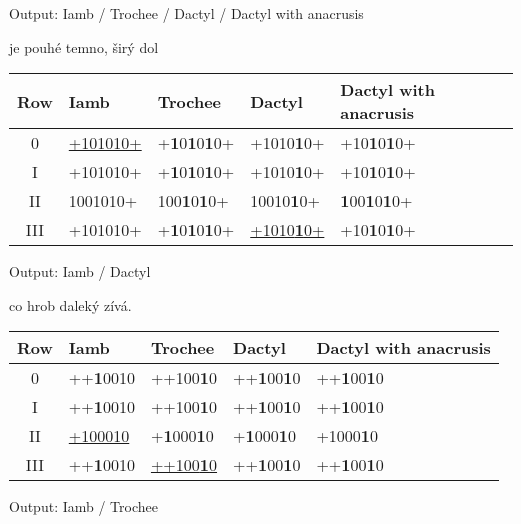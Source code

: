 Output: Iamb / Trochee / Dactyl / Dactyl with anacrusis

\begin{center}
je pouhé temno, širý dol\\
\begin{tabular}{c||m{2.5cm}|m{2.5cm}|m{2.5cm}|m{3.5cm}}
    Row & Iamb & Trochee & Dactyl & Dactyl with anacrusis\\\hline\hline
    0 & \underline{+101010+} & +\textbf{1}0\textbf{1}0\textbf{1}0+ & +1010\textbf{1}0+ & +10\textbf{1}0\textbf{1}0+\\
    I & +101010+ & +\textbf{1}0\textbf{1}0\textbf{1}0+ & +1010\textbf{1}0+ & +10\textbf{1}0\textbf{1}0+\\
    II & 1001010+ & 100\textbf{1}0\textbf{1}0+ & 10010\textbf{1}0+ & \textbf{1}00\textbf{1}0\textbf{1}0+\\
    III & +101010+ & +\textbf{1}0\textbf{1}0\textbf{1}0+ & \underline{+1010\textbf{1}0+} & +10\textbf{1}0\textbf{1}0+\\
\end{tabular}
\end{center}

Output: Iamb / Dactyl

co hrob daleký zívá.\\
\begin{center}
\begin{tabular}{c||m{2.5cm}|m{2.5cm}|m{2.5cm}|m{3.5cm}}
    Row & Iamb & Trochee & Dactyl & Dactyl with anacrusis\\\hline\hline
    0 & ++\textbf{1}0010 & ++100\textbf{1}0 & ++\textbf{1}00\textbf{1}0 & ++\textbf{1}00\textbf{1}0\\
    I & ++\textbf{1}0010 & ++100\textbf{1}0 & ++\textbf{1}00\textbf{1}0 & ++\textbf{1}00\textbf{1}0\\
    II & \underline{+100010} & +\textbf{1}000\textbf{1}0 & +\textbf{1}000\textbf{1}0 & +1000\textbf{1}0\\
    III & ++\textbf{1}0010 & \underline{++100\textbf{1}0} & ++\textbf{1}00\textbf{1}0 & ++\textbf{1}00\textbf{1}0\\
\end{tabular}
\end{center}

Output: Iamb / Trochee

